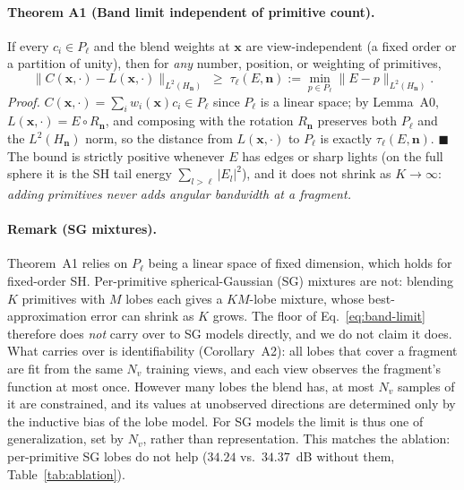 \paragraph{Theorem A1 (Band limit independent of primitive count).} If every $c_i\in P_\ell$ and
the blend weights at $\mathbf{x}$ are view-independent (a fixed order or a partition of unity),
then for \emph{any} number, position, or weighting of primitives,
\begin{equation}
\|C(\mathbf{x},\cdot)-L(\mathbf{x},\cdot)\|_{L^2(H_\mathbf{n})} \;\ge\;
\tau_\ell(E,\mathbf{n}) := \min_{p\in P_\ell}\|E-p\|_{L^2(H_\mathbf{n})}.
\label{eq:band-limit}
\end{equation}
\emph{Proof.} $C(\mathbf{x},\cdot)=\sum_i w_i(\mathbf{x})c_i\in P_\ell$ since $P_\ell$ is a linear
space; by Lemma~A0, $L(\mathbf{x},\cdot)=E\circ R_\mathbf{n}$, and composing with the rotation
$R_\mathbf{n}$ preserves both $P_\ell$ and the $L^2(H_\mathbf{n})$ norm, so the distance from
$L(\mathbf{x},\cdot)$ to $P_\ell$ is exactly $\tau_\ell(E,\mathbf{n})$. $\blacksquare$ The bound is
strictly positive whenever $E$ has edges or sharp lights (on the full sphere it is the SH tail
energy $\sum_{l>\ell}|E_l|^2$), and it does not shrink as $K\to\infty$: \emph{adding primitives
never adds angular bandwidth at a fragment.}

\begin{revblock}
\paragraph{Remark (SG mixtures).} Theorem~A1 relies on $P_\ell$ being a linear space of fixed
dimension, which holds for fixed-order SH. Per-primitive spherical-Gaussian (SG) mixtures are not:
blending $K$ primitives with $M$ lobes each gives a $KM$-lobe mixture, whose best-approximation error
can shrink as $K$ grows. The floor of Eq.~\eqref{eq:band-limit} therefore does \emph{not} carry over
to SG models directly, and we do not claim it does. What carries over is identifiability
(Corollary~A2): all lobes that cover a fragment are fit from the same $N_v$ training views, and each
view observes the fragment's function at most once. However many lobes the blend has, at most $N_v$
samples of it are constrained, and its values at unobserved directions are determined only by the
inductive bias of the lobe model. For SG models the limit is thus one of generalization, set by
$N_v$, rather than representation. This matches the ablation: per-primitive SG lobes do not help
($34.24$ vs.\ $34.37$~dB without them, Table~\ref{tab:ablation}).
\end{revblock}

